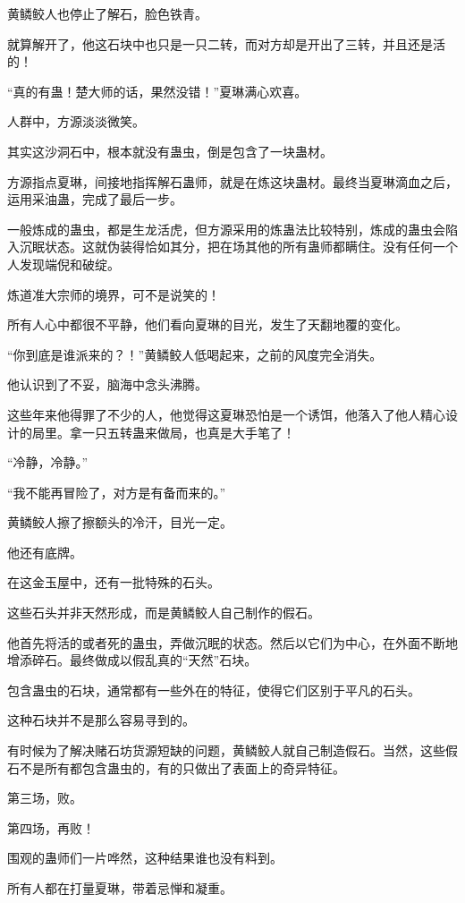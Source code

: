 \begin{this_body}
黄鳞鲛人也停止了解石，脸色铁青。

就算解开了，他这石块中也只是一只二转，而对方却是开出了三转，并且还是活的！

“真的有蛊！楚大师的话，果然没错！”夏琳满心欢喜。

人群中，方源淡淡微笑。

其实这沙洞石中，根本就没有蛊虫，倒是包含了一块蛊材。

方源指点夏琳，间接地指挥解石蛊师，就是在炼这块蛊材。最终当夏琳滴血之后，运用采油蛊，完成了最后一步。

一般炼成的蛊虫，都是生龙活虎，但方源采用的炼蛊法比较特别，炼成的蛊虫会陷入沉眠状态。这就伪装得恰如其分，把在场其他的所有蛊师都瞒住。没有任何一个人发现端倪和破绽。

炼道准大宗师的境界，可不是说笑的！

所有人心中都很不平静，他们看向夏琳的目光，发生了天翻地覆的变化。

“你到底是谁派来的？！”黄鳞鲛人低喝起来，之前的风度完全消失。

他认识到了不妥，脑海中念头沸腾。

这些年来他得罪了不少的人，他觉得这夏琳恐怕是一个诱饵，他落入了他人精心设计的局里。拿一只五转蛊来做局，也真是大手笔了！

“冷静，冷静。”

“我不能再冒险了，对方是有备而来的。”

黄鳞鲛人擦了擦额头的冷汗，目光一定。

他还有底牌。

在这金玉屋中，还有一批特殊的石头。

这些石头并非天然形成，而是黄鳞鲛人自己制作的假石。

他首先将活的或者死的蛊虫，弄做沉眠的状态。然后以它们为中心，在外面不断地增添碎石。最终做成以假乱真的“天然”石块。

包含蛊虫的石块，通常都有一些外在的特征，使得它们区别于平凡的石头。

这种石块并不是那么容易寻到的。

有时候为了解决赌石坊货源短缺的问题，黄鳞鲛人就自己制造假石。当然，这些假石不是所有都包含蛊虫的，有的只做出了表面上的奇异特征。

第三场，败。

第四场，再败！

围观的蛊师们一片哗然，这种结果谁也没有料到。

所有人都在打量夏琳，带着忌惮和凝重。


\end{this_body}
